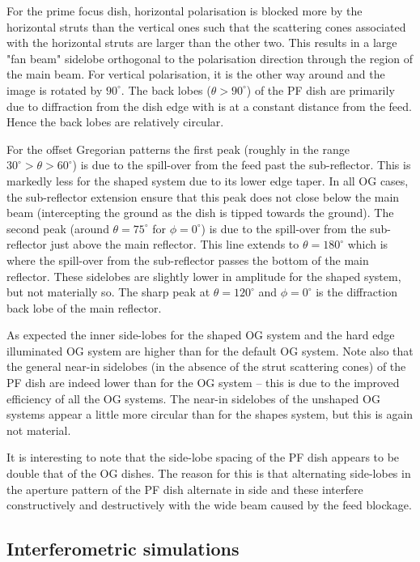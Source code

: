 \documentclass{aa}
\begin{document}
For the prime focus dish, horizontal polarisation is blocked more by the
horizontal struts than the vertical ones such that the scattering cones
associated with the horizontal struts are larger than the other two.  This
results in a large "fan beam" sidelobe orthogonal to the polarisation direction
through the region of the main beam.  For vertical polarisation, it is the other
way around and the image is rotated by $90^\circ$.  The back lobes ($\theta >
90^\circ$) of the PF dish are primarily due to diffraction from the dish edge
with is at a constant distance from the feed.  Hence the back lobes are
relatively circular.

For the offset Gregorian patterns the first peak (roughly in the range $30^\circ
> \theta > 60^\circ$) is due to the spill-over from the feed past the
sub-reflector. This is markedly less for the shaped system due to its lower edge
taper.  In all OG cases, the sub-reflector extension ensure that this peak does
not close below the main beam (intercepting the ground as the dish is tipped
towards the ground).  The second peak (around $\theta = 75^\circ$ for $\phi =
0^\circ$) is due to the spill-over from the sub-reflector just above the main
reflector.  This line extends to $\theta = 180^\circ$ which is where the
spill-over from the sub-reflector passes the bottom of the main reflector.
These sidelobes are slightly lower in amplitude for the shaped system, but not
materially so.  The sharp peak at $\theta = 120^\circ$ and $\phi = 0^\circ$ is
the diffraction back lobe of the main reflector.

As expected the inner side-lobes for the shaped OG system and the hard edge
illuminated OG system are higher than for the default OG system.  Note also that
the general near-in sidelobes (in the absence of the strut scattering cones) of
the PF dish are indeed lower than for the OG system -- this is due to the
improved efficiency of all the OG systems.  The near-in sidelobes of the
unshaped OG systems appear a little more circular than for the shapes system,
but this is again not material.

It is interesting to note that the side-lobe spacing of the PF dish appears to
be double that of the OG dishes.  The reason for this is that alternating
side-lobes in the aperture pattern of the PF dish alternate in side and these
interfere constructively and destructively with the wide beam caused by the feed
blockage.


\subsection{Interferometric simulations}
\end{document}
